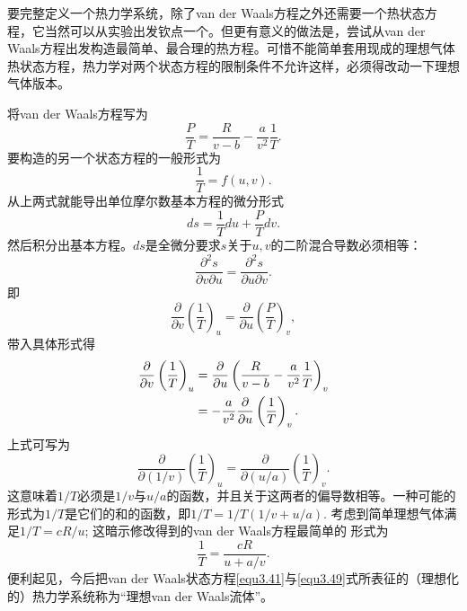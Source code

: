 要完整定义一个热力学系统，除了van der Waals方程之外还需要一个热状态方程，它当然可以从实验出发钦点一个。但更有意义的做法是，尝试从van der Waals方程出发构造最简单、最合理的热方程。可惜不能简单套用现成的理想气体热状态方程，热力学对两个状态方程的限制条件不允许这样，必须得改动一下理想气体版本。

将van der Waals方程写为
\begin{equation}
	\frac{P}{T} = \frac{R}{v - b} - \frac{a}{v^2} \frac{1}{T}.
\label{equ3.42}
\end{equation}
要构造的另一个状态方程的一般形式为
\begin{equation}
	\frac{1}{T} = f(u, v).
\label{equ3.43}
\end{equation}
从上两式就能导出单位摩尔数基本方程的微分形式
\begin{equation}
	ds = \frac{1}{T} du + \frac{P}{T} dv.
\label{equ3.44}
\end{equation}
然后积分出基本方程。$ds$是全微分要求$s$关于$u, v$的二阶混合导数必须相等：
\begin{equation}
	\frac{\partial^2 s}{\partial v \partial u} = \frac{\partial^2 s}{\partial u \partial v}.
\label{equ3.45}
\end{equation}
即
\begin{equation}
    \frac{\partial}{\partial v} \left( \frac{1}{T} \right)_u = \frac{\partial}{\partial u} \left( \frac{P}{T} \right)_v,
\label{equ3.46}
\end{equation}
带入具体形式得
\begin{align}
    \frac{\partial}{\partial v} \left( \frac{1}{T} \right)_u &= \frac{\partial}{\partial u} \left( \frac{R}{v - b} - \frac{a}{v^2} \frac{1}{T} \right)_v \notag \\
    &= -\frac{a}{v^2} \frac{\partial}{\partial u} \left( \frac{1}{T} \right)_v.
\label{equ3.47}
\end{align}
上式可写为
\begin{equation}
    \frac{\partial}{\partial (1/v)} \left( \frac{1}{T} \right)_u = \frac{\partial}{\partial(u/a)} \left( \frac{1}{T} \right)_v.
\label{equ3.48}
\end{equation}
这意味着$1/T$必须是$1/v$与$u/a$的函数，并且关于这两者的偏导数相等。一种可能的形式为$1/T$是它们的和的函数，即$1/T = 1/T(1/v + u/a)$. 考虑到简单理想气体满足$1/T = cR/u$; 这暗示修改得到的van der Waals方程最简单的 形式为
\begin{equation}
    \frac{1}{T} = \frac{cR}{u + a/v}.
\label{equ3.49}
\end{equation}
便利起见，今后把van der Waals状态方程\eqref{equ3.41}与\eqref{equ3.49}式所表征的（理想化的）热力学系统称为“理想van der Waals流体”。

